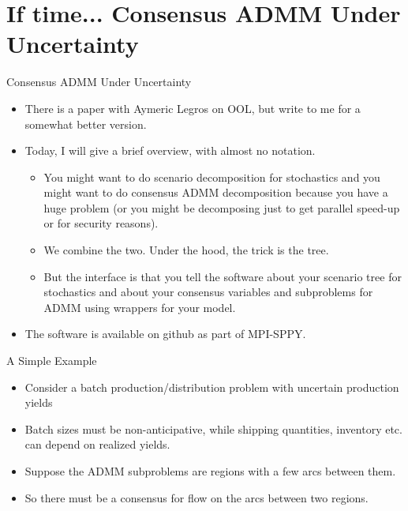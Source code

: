 \documentclass[9pt,usenames,dvipsnames]{beamer}
\begin{document}
\section{If time... Consensus ADMM Under Uncertainty}

\begin{frame}{Consensus ADMM Under Uncertainty}
  \begin{itemize}
  \item There is a paper with Aymeric Legros on OOL, but write to me for a somewhat better version.
  \item Today, I will give a brief overview, with almost no notation.
    \begin{itemize}
    \item You might want to do scenario decomposition for stochastics and you might want to do consensus ADMM decomposition because you have a huge problem (or you might be decomposing just to get parallel speed-up or for security reasons).
    \item We combine the two. Under the hood, the trick is the tree.
      \item But the interface is that you tell the software about your scenario tree for stochastics and about your consensus variables and subproblems for ADMM using wrappers for your model.
      \end{itemize}
    \item The software is available on github as part of MPI-SPPY.
  \end{itemize}
\end{frame}

\begin{frame}{A Simple Example}
  \begin{itemize}
  \item Consider a batch production/distribution problem with uncertain production yields
  \item Batch sizes must be non-anticipative, while shipping quantities, inventory etc. can depend on realized yields.
  \item Suppose the ADMM subproblems are regions with a few arcs between them.
    \item So there must be a consensus for flow on the arcs between two regions.
  \end{itemize}


\end{frame}
\end{document}
